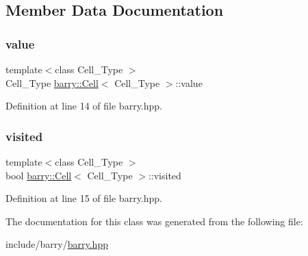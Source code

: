 \subsection{Member Data Documentation}
\mbox{\label{classbarry_1_1_cell_a52918ded332c6a12109b5962d6bf3ae9}} 
\subsubsection{\texorpdfstring{value}{value}}
{\footnotesize\ttfamily template$<$class Cell\+\_\+\+Type $>$ \\
Cell\+\_\+\+Type \hyperlink{classbarry_1_1_cell}{barry\+::\+Cell}$<$ Cell\+\_\+\+Type $>$\+::value}



Definition at line 14 of file barry.\+hpp.

\mbox{\label{classbarry_1_1_cell_ad7800879e5079e6b5a3982827adc38c1}} 
\subsubsection{\texorpdfstring{visited}{visited}}
{\footnotesize\ttfamily template$<$class Cell\+\_\+\+Type $>$ \\
bool \hyperlink{classbarry_1_1_cell}{barry\+::\+Cell}$<$ Cell\+\_\+\+Type $>$\+::visited}



Definition at line 15 of file barry.\+hpp.



The documentation for this class was generated from the following file\+:\begin{DoxyCompactItemize}
\item 
include/barry/\hyperlink{barry_8hpp}{barry.\+hpp}\end{DoxyCompactItemize}

